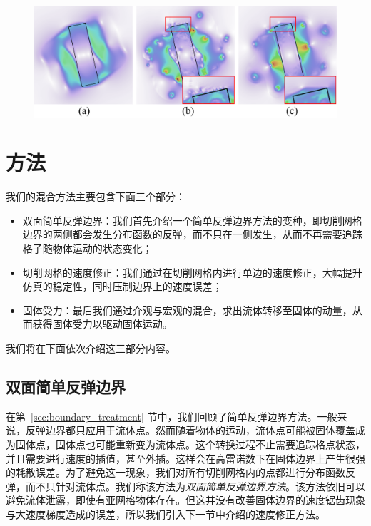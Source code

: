 \begin{figure}[htb]
    \centering
      \includegraphics[width=0.95\columnwidth]{figures/ib-mbb.png}
    \label{img:Immersed_Bounce_back}
\end{figure}

\section{方法}
我们的混合方法主要包含下面三个部分：
\begin{itemize}
\item 双面简单反弹边界：我们首先介绍一个简单反弹边界方法的变种，即切削网格边界的两侧都会发生分布函数的反弹，而不只在一侧发生，从而不再需要追踪格子随物体运动的状态变化；
\item 切削网格的速度修正：我们通过在切削网格内进行单边的速度修正，大幅提升仿真的稳定性，同时压制边界上的速度误差；
\item 固体受力：最后我们通过介观与宏观的混合，求出流体转移至固体的动量，从而获得固体受力以驱动固体运动。
\end{itemize}

我们将在下面依次介绍这三部分内容。

\subsection{双面简单反弹边界}
在第~\ref{sec:boundary_treatment} 节中，我们回顾了简单反弹边界方法。一般来说，反弹边界都只应用于流体点。然而随着物体的运动，流体点可能被固体覆盖成为固体点，固体点也可能重新变为流体点。这个转换过程不止需要追踪格点状态，并且需要进行速度的插值，甚至外插。这样会在高雷诺数下在固体边界上产生很强的耗散误差。为了避免这一现象，我们对所有切削网格内的点都进行分布函数反弹，而不只针对流体点。我们称该方法为\emph{双面简单反弹边界方法}。该方法依旧可以避免流体泄露，即使有亚网格物体存在。但这并没有改善固体边界的速度锯齿现象与大速度梯度造成的误差，所以我们引入下一节中介绍的速度修正方法。

